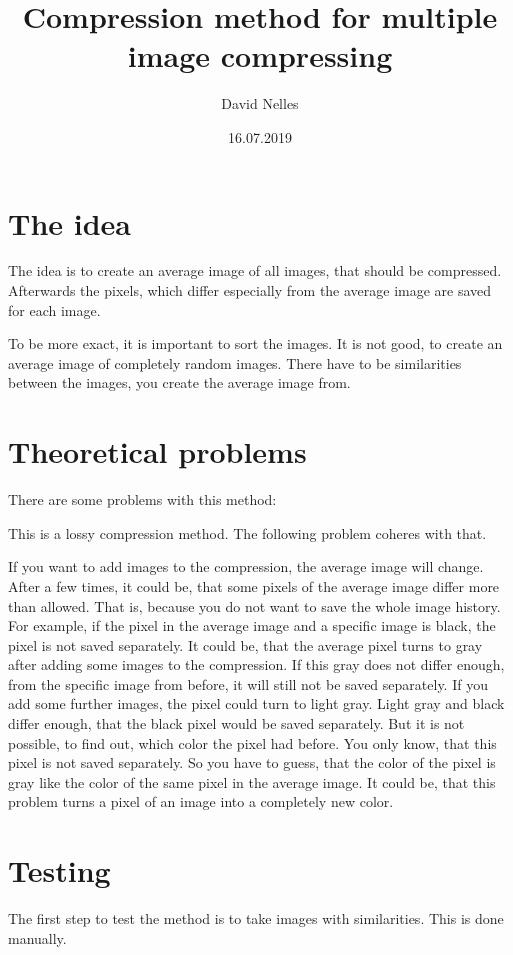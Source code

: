 \documentclass[10pt,a4paper,parskip=full]{scrartcl}
\title{Compression method for multiple image compressing}
\author{David Nelles}
\date{16.07.2019}
\begin{document}
	\maketitle
	\newpage
	\tableofcontents
	\newpage
	\section{The idea}
	The idea is to create an average image of all images, that should be compressed. Afterwards the pixels, which differ especially from the average image are saved for each image.
	
	To be more exact, it is important to sort the images. It is not good, to create an average image of completely random images. There have to be similarities between the images, you create the average image from.
	
	\section{Theoretical problems}
	There are some problems with this method:
	
	This is a lossy compression method. The following problem coheres with that.
	
	If you want to add images to the compression, the average image will change. After a few times, it could be, that some pixels of the average image differ more than allowed. That is, because you do not want to save the whole image history. For example, if the pixel in the average image and a specific image is black, the pixel is not saved separately. It could be, that the average pixel turns to gray after adding some images to the compression. If this gray does not differ enough, from the specific image from before, it will still not be saved separately. If you add some further images, the pixel could turn to light gray. Light gray and black differ enough, that the black pixel would be saved separately. But it is not possible, to find out, which color the pixel had before. You only know, that this pixel is not saved separately. So you have to guess, that the color of the pixel is gray like the color of the same pixel in the average image. It could be, that this problem turns a pixel of an image into a completely new color.
	
	\section{Testing}
	The first step to test the method is to take images with similarities. This is done manually.
	
\end{document}

